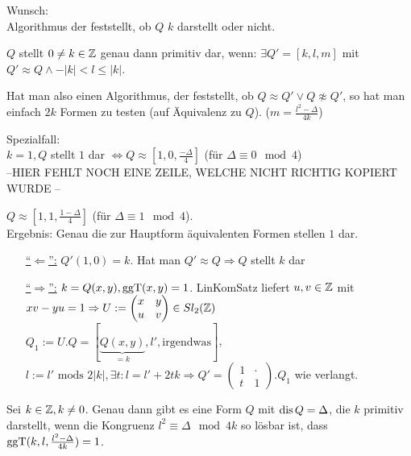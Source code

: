 \documentclass[a4paper,twoside,DIV15,BCOR12mm]{scrbook}
\begin{document}
Wunsch:\\
Algorithmus der feststellt, ob $Q$ $k$ darstellt oder nicht.

\begin{satz}[1. Darstellungssatz]
$Q$ stellt $0 \not= k \in \mathbb{Z}$ genau dann primitiv dar, wenn: $\exists Q' = [k,l,m]$ mit $Q' \approx Q \wedge -|k| < l \le |k|$.
\end{satz}
Hat man also einen Algorithmus, der feststellt, ob $Q \approx Q' \vee Q \not\approx Q'$, so hat man einfach $2k$ Formen zu testen (auf Äquivalenz zu $Q$). ($m = \frac{l^2 - \Delta}{4k}$)

Spezialfall:\\
$k = 1, Q$ stellt $1$ dar $\Leftrightarrow Q \approx [1, 0, \frac{-\Delta}{4}]$ (für $\Delta \equiv 0 \mod 4$)\\
--HIER FEHLT NOCH EINE ZEILE, WELCHE NICHT RICHTIG KOPIERT WURDE --

$Q \approx [1, 1, \frac{1 - \Delta}{4}]$ (für $\Delta \equiv 1 \mod 4$).\\
Ergebnis: Genau die zur Hauptform äquivalenten Formen stellen $1$ dar.

\begin{beweis}
\begin{itemize}
\item[\underline{"`$\Leftarrow$"':}] $Q'(1,0) = k$. Hat man $Q' \approx Q \Rightarrow Q$ stellt $k$ dar
\item[\underline{"`$\Rightarrow$"':}] $k = Q(x,y), \mathop{\rm ggT}\nolimits (x,y) = 1$. LinKomSatz liefert $u,v \in \mathbb{Z}$ mit $xv-yu = 1 \Rightarrow U := \begin{pmatrix}x & y\\u & v\end{pmatrix} \in Sl_2(\mathbb{Z})$\\
$Q_1 := U.Q = [\underbrace{Q(x,y)}_{=k}, l', \text{irgendwas}]$, $l := l' \text{ mods } 2|k|, \exists t: l = l' + 2tk \Rightarrow Q' = \begin{pmatrix}1 & \cdot \\ t & 1\end{pmatrix}.Q_1$ wie verlangt.
\end{itemize}
\end{beweis}

\begin{satz}[2. Darstellungssatz]
Sei $k \in \mathbb{Z}, k \not= 0$. Genau dann gibt es eine Form $Q$ mit $\mathop{\rm dis}\nolimits Q = \Delta$, die $k$ primitiv darstellt, wenn die Kongruenz $l^2 \equiv \Delta \mod 4k$ so lösbar ist, dass $\mathop{\rm ggT}\nolimits (k, l, \frac{l^2 - \Delta}{4k}) = 1$.
\end{satz}
\end{document}
